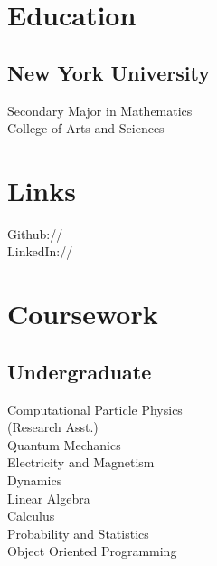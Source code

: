 \documentclass[]{deedy-resume-openfont}
\begin{document}
\lastupdated


%
%

\begin{minipage}[t]{0.33\textwidth} 

\section{Education} 
\subsection{New York University}

Secondary Major in Mathematics \\
College of Arts and Sciences\\
\sectionsep


\section{Links} 
Github:// \href{https://github.com/jcorrado76}{} \\
LinkedIn://  \href{https://www.linkedin.com/in/joseph-corrado-9737b2a6/}{} \\
\sectionsep


\section{Coursework}
\subsection{Undergraduate}
Computational Particle Physics \\
(Research Asst.)\\
Quantum Mechanics\\
Electricity and Magnetism\\
Dynamics\\
Linear Algebra\\
Calculus\\
Probability and Statistics\\
Object Oriented Programming\\
\sectionsep


\end{minipage}
\end{document}
